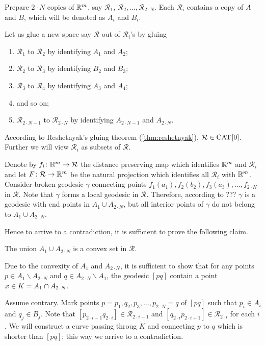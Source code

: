 Prepare $2\cdot N$ copies of $\mathbb{R}^m$,
say $\mathcal{R}_1$, $\mathcal{R}_2,\dots,\mathcal{R}_{2\cdot N}$.
Each $\mathcal{R}_i$ contains a copy of $A$ and $B$, which will be denoted as $A_i$ and $B_i$.

Let us glue a new space say $\mathcal{R}$ out of $\mathcal{R}_i$'s
by gluing 
\begin{enumerate}
\item $\mathcal{R}_1$ to $\mathcal{R}_2$ by identifying $A_1$ and $A_2$;
\item $\mathcal{R}_2$ to $\mathcal{R}_3$  by identifying $B_2$ and $B_3$;
\item $\mathcal{R}_3$ to $\mathcal{R}_4$  by identifying $A_3$ and $A_4$;
\item and so on;
\item $\mathcal{R}_{2\cdot N-1}$ to $\mathcal{R}_{2\cdot N}$ by identifying $A_{2\cdot N-1}$ and $A_{2\cdot N}$.
\end{enumerate}
According to Reshetnyak's gluing theorem (\ref{thm:reshetnyak}), $\mathcal{R}\in\CAT{}{0}$.
Further we will view $\mathcal{R}_i$ as subsets of $\mathcal{R}$.

Denote by $f_i\colon\mathbb{R}^m\to\mathcal{R}$ the distance preserving map which identifies $\mathbb{R}^m$ and $\mathcal{R}_i$
and let $F\colon\mathcal{R} \to \mathbb{R}^m$ be the natural projection which identifies all $\mathcal{R}_i$ with $\mathbb{R}^m$.
Consider broken geodesic $\gamma$ connecting points $f_1(a_1),f_2(b_2),f_3(a_3),\dots,f_{2\cdot N}$ in $\mathcal{R}$.
Note that $\gamma$ forms a local geodesic in $\mathcal{R}$.
Therefore, according to ??? $\gamma$ is a geodesic with end points in $A_1\cup A_{2\cdot N}$,
but all interior points of $\gamma$ do not belong to $A_1\cup A_{2\cdot N}$.

Hence to arrive to a contradiction, it is sufficient to prove the following claim.
 
\begin{clm}{}
The union $A_1\cup A_{2\cdot N}$ is a convex set in $\mathcal{R}$.
\end{clm}

Due to the convexity of $A_1$ and $A_{2\cdot N}$,
it is sufficient to show that for any points $p\in A_1\backslash A_{2\cdot N}$ and $q\in A_{2\cdot N}\backslash A_1$,
the geodesic $[pq]$ contain a point $x\in K\z=A_1\cap A_{2\cdot N}$.

Assume contrary.
Mark points $p=p_1,q_2,p_3,\dots,p_{2\cdot N}=q$ of $[pq]$ such that $p_i\in A_i$ and $q_j\in B_j$.
Note that $[p_{2\cdot i-1}q_{2\cdot i}]\in \mathcal{R}_{2\cdot i-1}$ 
and 
$[q_{2\cdot i}p_{2\cdot i+1}]\in \mathcal{R}_{2\cdot i}$ for each $i$.
We will construct a curve passing throug $K$ and connecting $p$ to $q$ which is shorter than $[pq]$;
this way we arrive to a contradiction. 




